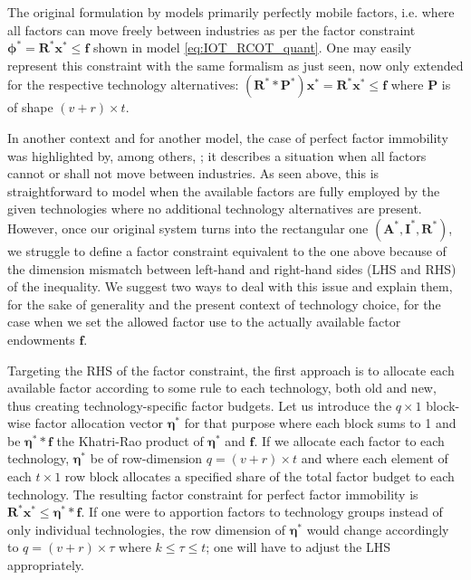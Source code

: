 \documentclass{article}
\begin{document}
\begin{refsection}
The original formulation by \textcite{duchin_2011} models primarily perfectly mobile factors, i.e. where all factors can move freely between industries as per the factor constraint $\bm{\phi}^{*} = \bm{R}^{*} \bm{x}^{*} \le \bm{f}$ shown in model \ref{eq:IOT_RCOT_quant}\footnotemark{}. One may easily represent this constraint with the same formalism as just seen, now only extended for the respective technology alternatives: $(\bm{R}^{*} \ast \bm{P}^{*}) \bm{x}^{*} = \bm{R}^{*} \bm{x}^{*} \le \bm{f}$ where $\bm{P}$ is of shape $(v + r) \times t$.

In another context and for another model, the case of perfect factor immobility was highlighted by, among others, \textcite{tenRaa_1994,shestalova_2019}; it describes a situation when all factors cannot or shall not move between industries. As seen above, this is straightforward to model when the available factors are fully employed by the given technologies where no additional technology alternatives are present. However, once our original system turns into the rectangular one $(\bm{A}^{*}, \bm{I}^{*}, \bm{R}^{*})$, we struggle to define a factor constraint equivalent to the one above because of the dimension mismatch between left-hand and right-hand sides (LHS and RHS) of the inequality. We suggest two ways to deal with this issue and explain them, for the sake of generality and the present context of technology choice, for the case when we set the allowed factor use to the actually available factor endowments $\bm{f}$.


Targeting the RHS of the factor constraint, the first approach is to allocate each available factor according to some rule to each technology, both old and new, thus creating technology-specific factor budgets. Let us introduce the $q \times 1$ block-wise factor allocation vector $\bm{\eta}^{*}$ for that purpose where each block sums to 1 and be $\bm{\eta}^{*} \ast \bm{f}$ the Khatri-Rao product of $\bm{\eta}^{*}$ and $\bm{f}$. If we allocate each factor to each technology, $\bm{\eta}^{*}$ be of row-dimension $q = (v + r) \times t$ and where each element of each $t \times 1$ row block allocates a specified share of the total factor budget to each technology. The resulting factor constraint for perfect factor immobility is $\bm{R}^{*} \bm{x}^{*} \le \bm{\eta}^{*} \ast \bm{f}$. If one were to apportion factors to technology groups instead of only individual technologies, the row dimension of $\bm{\eta}^{*}$ would change accordingly to $q = (v + r) \times \tau$ where $k \le \tau \le t$; one will have to adjust the LHS appropriately.


\end{refsection}
\end{document}
